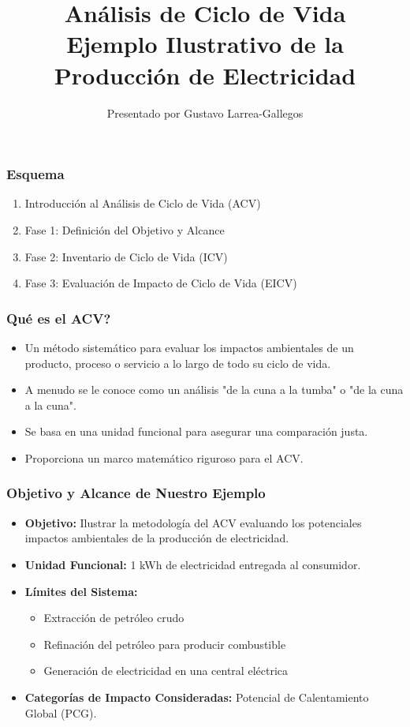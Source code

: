 \documentclass{beamer}
\title[Análisis de Ciclo de Vida]{Análisis de Ciclo de Vida \\ \large Ejemplo Ilustrativo de la Producción de Electricidad}
\author{Presentado por Gustavo Larrea-Gallegos}
\begin{document}
\begin{frame}
  \titlepage
\end{frame}

\begin{frame}
  \frametitle{Esquema}
  \begin{enumerate}
    \item Introducción al Análisis de Ciclo de Vida (ACV)
    \item Fase 1: Definición del Objetivo y Alcance
    \item Fase 2: Inventario de Ciclo de Vida (ICV)
    \item Fase 3: Evaluación de Impacto de Ciclo de Vida (EICV)
  \end{enumerate}
\end{frame}

\begin{frame}
  \frametitle{Qué es el ACV?}
  \begin{itemize}
    \item Un método sistemático para evaluar los impactos ambientales de un producto, proceso o servicio a lo largo de todo su ciclo de vida.
    \item A menudo se le conoce como un análisis "de la cuna a la tumba" o "de la cuna a la cuna".
    \item Se basa en una unidad funcional para asegurar una comparación justa.
    \item Proporciona un marco matemático riguroso para el ACV.
  \end{itemize}
\end{frame}

\begin{frame}
  \frametitle{Objetivo y Alcance de Nuestro Ejemplo}
  \begin{itemize}
    \item \textbf{Objetivo:} Ilustrar la metodología del ACV evaluando los potenciales impactos ambientales de la producción de electricidad.
    \item \textbf{Unidad Funcional:} 1 kWh de electricidad entregada al consumidor.
    \item \textbf{Límites del Sistema:}
    \begin{itemize}
      \item Extracción de petróleo crudo
      \item Refinación del petróleo para producir combustible
      \item Generación de electricidad en una central eléctrica
    \end{itemize}
    \item \textbf{Categorías de Impacto Consideradas:} Potencial de Calentamiento Global (PCG).
  \end{itemize}
\end{frame}
\end{document}

